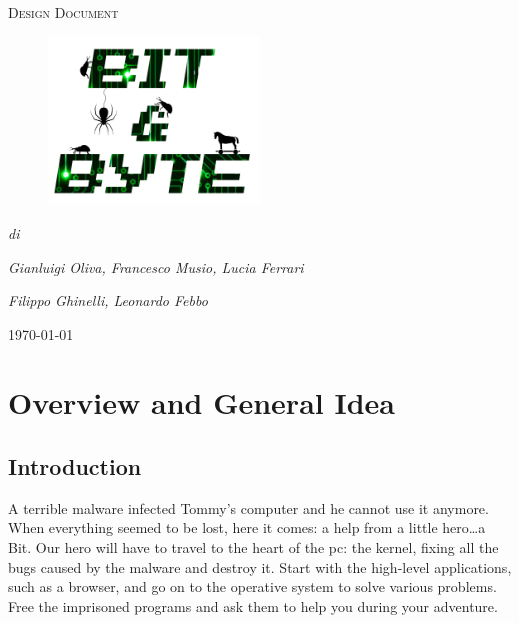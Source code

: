 \documentclass[12pt, a4paper]{report}
\begin{document}
\begin{titlepage}
	\centering
	\vspace{1cm}
	\vspace{1cm}

	{\scshape\Large Design Document\par}
	\vspace{0.1cm}
	\begin{figure}[H]
		\centering
		\includegraphics[width=0.5\textwidth]{images/Logo}
	\end{figure}
	\vspace{1cm}
	\vspace{3cm}
	{\Large\itshape di\par}
	{\Large\itshape Gianluigi Oliva, Francesco Musio, Lucia Ferrari\par}
	{\Large\itshape Filippo Ghinelli, Leonardo Febbo\par}
	\vspace{1.5cm}
	\vfill
	


	\vfill

	{\large \today\par}
\end{titlepage}

\newpage
\tableofcontents
\newpage

\chapter{Overview and General Idea}
\section*{Introduction}
A terrible malware infected Tommy’s computer and he cannot use it anymore. When everything seemed to be lost, here it comes: a help from a little hero…a Bit. Our hero will have to travel to the heart of the pc: the kernel, fixing all the bugs caused by the malware and destroy it. Start with the high-level applications, such as a browser, and go on to the operative system to solve various problems. Free the imprisoned programs and ask them to help you during your adventure.\\
\end{document}
